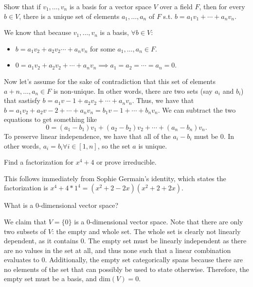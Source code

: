 \documentclass{scrartcl}
\begin{document}
\begin{problem}[7]
	Show that if $v_1,\dotsc,v_n$ is a basis for a vector space $V$ over a field $F$, then for every $b \in V$, there is a unique set of elements $a_1,\dotsc,a_n$ of $F$ s.t. $b=a_1v_1+\cdots+a_nv_n$.
\end{problem}

\begin{solution}
	We know that because $v_1,\dotsc,v_n$ is a basis, $\forall b \in V$:
	\begin{itemize}
		\item $b = a_1v_2 + a_2v_2 \cdots + a_nv_n$ for some $a_1,\dotsc,a_n \in F$.
		\item $0 = a_1v_2 + a_2v_2 + \cdots + a_nv_n \implies a_1=a_2=\cdots=a_n = 0$.
	\end{itemize}

	Now let's assume for the sake of contradiction that this set of elements $a+n,\dotsc,a_n \in F$ is non-unique. In other words, there are two sets (say $a_i$ and $b_i$) that sastisfy $b = a_1v-1 + a_2v_2 + \cdots + a_nv_n$.
	Thus, we have that $b = a_1v_2 + a_2v-2 + \cdots + a_nv_n = b_1v-1 + \cdots + b_nv_n$. We can subtract the two equations to get something like
	$$0 = (a_1-b_1)v_1 + (a_2-b_2)v_2 + \cdots + (a_n-b_n)v_n.$$
	To preserve linear independence, we have that all of the $a_i-b_i$ must be $0$. In other words, $a_i = b_i \forall i \in [1, n]$, so the set $a$ is unique. \blackqed
\end{solution}

\begin{problem}[12]
	Find a factorization for $x^4+4$ or prove irreducible.
\end{problem}

\begin{solution}
	This follows immediately from Sophie Germain's identity, which states the factorization is $x^4+4*1^4 = (x^2+2-2x)(x^2+2+2x)$.
\end{solution}

\begin{problem}[13]
	What is a 0-dimensional vector space?
\end{problem}

\begin{solution}
	We claim that $V=\{0\}$ is a 0-dimensional vector space. Note that there are only two subsets of $V$: the empty and whole set. The whole set is clearly not linearly dependent, as it contains 0. The empty set must be linearly independent as there are no values in the set at all, and thus none such that a linear combination evaluates to 0. Additionally, the empty set categorically spans because there are no elements of the set that can possibly be used to state otherwise. Therefore, the empty set must be a basis, and $\text{dim}(V) = 0$. \blackqed
\end{solution}
\end{document}
